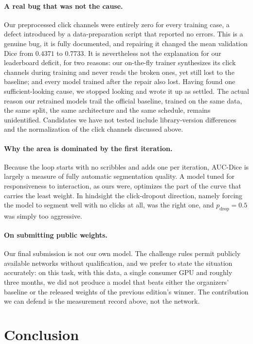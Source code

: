 \documentclass[runningheads]{llncs}
\begin{document}
\paragraph{A real bug that was not the cause.}
Our preprocessed click channels were entirely zero for every training case, a
defect introduced by a data-preparation script that reported no errors. This is
a genuine bug, it is fully documented, and repairing it changed the mean
validation Dice from $0.4371$ to $0.7733$. It is nevertheless not the
explanation for our leaderboard deficit, for two reasons: our on-the-fly
trainer synthesizes its click channels during training and never reads the
broken ones, yet still lost to the baseline; and every model trained after the
repair also lost. Having found one sufficient-looking cause, we stopped looking
and wrote it up as settled. The actual reason our retrained models trail the
official baseline, trained on the same data, the same split, the same
architecture and the same schedule, remains unidentified. Candidates we have
not tested include library-version differences and the normalization of the
click channels discussed above.

\paragraph{Why the area is dominated by the first iteration.}
Because the loop starts with no scribbles and adds one per iteration, AUC-Dice
is largely a measure of fully automatic segmentation quality. A model tuned for
responsiveness to interaction, as ours were, optimizes the part of the curve
that carries the least weight. In hindsight the click-dropout direction, namely
forcing the model to segment well with no clicks at all, was the right one, and
$p_{\mathrm{drop}}=0.5$ was simply too aggressive.

\paragraph{On submitting public weights.}
Our final submission is not our own model. The challenge rules permit publicly
available networks without qualification, and we prefer to state the situation
accurately: on this task, with this data, a single consumer GPU and roughly
three months, we did not produce a model that beats either the organizers'
baseline or the released weights of the previous edition's winner. The
contribution we can defend is the measurement record above, not the network.

\section{Conclusion}
\end{document}
